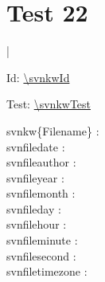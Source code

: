 \documentclass[12pt]{report}
\begin{document}
\chapter{Test 22}

\noindent
{} | 

Id: \url{\svnkwId}
\svnkwId

Test: \url{\svnkwTest}
\svnkwTest

 \noindent
 svnkw\{Filename\} :  \\
 svnfiledate : \svnfiledate  \\
 svnfileauthor : \svnfileauthor  \\
 svnfileyear : \svnfileyear  \\
 svnfilemonth : \svnfilemonth  \\
 svnfileday : \svnfileday  \\
 svnfilehour : \svnfilehour  \\
 svnfileminute : \svnfileminute  \\
 svnfilesecond : \svnfilesecond  \\
 svnfiletimezone : \svnfiletimezone  \\
\end{document}
